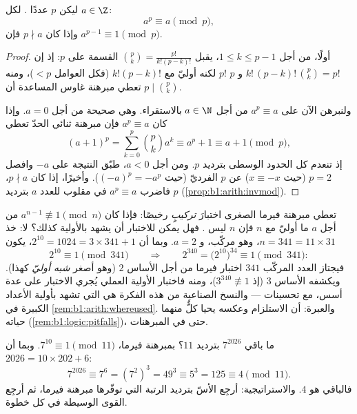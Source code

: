 \begin{theorem}\label{thm:b1:arith:fermat}
ليكن $p$ عددًا . لكل $a \in \Z$:
\[
a^p \equiv a \pmod p,
\]
وإذا كان $p \nmid a$ فإن $a^{p-1} \equiv 1 \pmod
p$.
\end{theorem}

\begin{proof}
أولًا، من أجل $1 \leq k \leq p - 1$، يقبل  $\binom pk
= \frac{p!}{k!(p-k)!}$ القسمة على $p$: إذ إن $k!\,(p-k)!\,
\binom pk = p!$ و $p$  $p!$ لكنه أوليّ مع $k!(p-k)!$
(فكل العوامل $< p$)، ومنه تعطي مبرهنة غاوس المساعدة أن $p \mid \binom pk$.

ولنبرهن الآن على $a^p \equiv a$ من أجل $a \in \N$ بالاستقراء. وهي صحيحة من أجل $a =
0$. وإذا كان $a^p \equiv a$ فإن مبرهنة ثنائي الحدّ تعطي
\[
(a+1)^p = \sum_{k=0}^{p} \binom pk a^k
\equiv a^p + 1 \equiv a + 1 \pmod p,
\]
إذ تنعدم كل الحدود الوسطى بترديد $p$. ومن أجل $a < 0$، طبّق النتيجة على
$-a$ وافصل $p = 2$ (حيث $x \equiv -x$) عن $p$ الفرديّ (حيث
$(-a)^p = -a^p$). وأخيرًا، إذا كان $p \nmid a$، فاضرب $a^p \equiv a$ في
مقلوب للعدد $a$ بترديد $p$ (\cref{prop:b1:arith:invmod}).
\end{proof}

\begin{example}\label{ex:b1:arith:pseudoprime}
تعطي مبرهنة فيرما الصغرى اختبارَ \emph{تركيبٍ} رخيصًا:
فإذا كان $a^{n-1} \not\equiv 1 \pmod n$ من أجل $a$ ما أوليّ مع $n$
فإن $n$ ليس . فهل يمكن للاختبار أن يشهد بالأولية كذلك؟ لا:
خذ $n = 341 = 11 \times 31$، وهو مركّب، و $a = 2$. وبما أن
$2^{10} = 1024 = 3 \times 341 + 1$، يكون
\[
2^{10} \equiv 1 \pmod{341}
\qquad\Longrightarrow\qquad
2^{340} = \bigl(2^{10}\bigr)^{34} \equiv 1 \pmod{341} :
\]
فيجتاز العدد المركّب $341$ اختبار فيرما من أجل الأساس $2$ (وهو
أصغر \emph{شبه أوليّ} كهذا). ويكشفه الأساس $3$
(إذ $3^{340} \not\equiv 1$)، ومنه فاختبار الأولية العملي
يُجري الاختبار على عدة أسس، مع تحسينات ---
والنسخ الصناعية من هذه الفكرة هي التي تشهد بأولية
الأعداد الكبيرة في \cref{rem:b1:arith:whereused}. والعبرة: أن الاستلزام
وعكسه يحيا كلٌّ منهما حياته
(\cref{rem:b1:logic:pitfalls})، حتى في المبرهنات.
\end{example}

\begin{example}\label{ex:b1:arith:congruences}
ما باقي $7^{2026}$ بترديد $11$؟ بمبرهنة فيرما، $7^{10}
\equiv 1 \pmod{11}$. وبما أن $2026 = 10 \times 202 + 6$:
\[
7^{2026} \equiv 7^6 = (7^2)^3 = 49^3 \equiv 5^3 = 125 \equiv 4
\pmod{11}.
\]
فالباقي هو $4$. والاستراتيجية: أرجِع الأسّ بترديد
الرتبة التي توفّرها مبرهنة فيرما، ثم أرجِع القوى الوسيطة في كل
خطوة.
\end{example}

